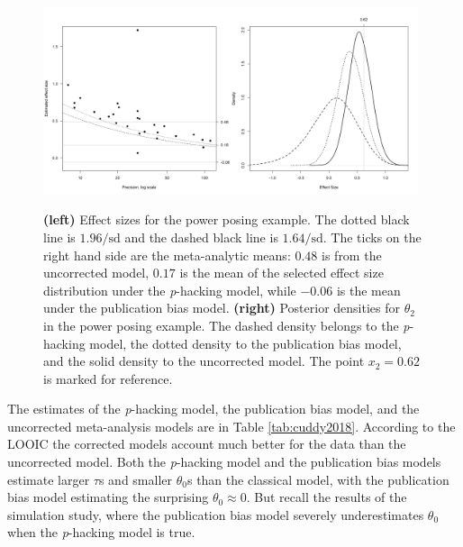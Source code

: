 \documentclass{article}
\theoremstyle{plain}
\theoremstyle{definition}
\begin{document}
\begin{figure}
\noindent \begin{centering}
\includegraphics[width=0.49\textwidth]{plots/cuddy2018}\includegraphics[width=0.49\textwidth]{plots/cuddy2018_posterior}
\par\end{centering}
\caption{\label{fig:cuddy2017} \textbf{(left)} Effect sizes for the power posing example. The dotted black line is $1.96/\textrm{sd}$ and the dashed black line is $1.64/\textrm{sd}$. The ticks on the right hand side are
the meta-analytic means: $0.48$ is from the uncorrected model, $0.17$ is the mean of the selected effect size distribution under the \textit{p}-hacking model, while $-0.06$ is the mean under the publication bias model. \textbf{(right)} Posterior densities for $\theta_{2}$ in the power posing example. The dashed density belongs to the \textit{p}-hacking model, the dotted density to the publication bias model, and the solid density to the uncorrected model. The point $x_{2}=0.62$ is marked for reference.}
\end{figure}

The estimates of the \textit{p}-hacking model, the publication bias model, and the uncorrected meta-analysis models are in Table \ref{tab:cuddy2018}. According to the LOOIC the corrected models account much better for the data than the uncorrected model. Both the \textit{p}-hacking model and the publication bias models estimate
larger $\tau$s and smaller $\theta_{0}$s than the classical model, with the publication bias model estimating the surprising $\theta_{0}\approx0$. But recall the results of the simulation study, where the publication bias model severely underestimates $\theta_0$ when the \textit{p}-hacking model is true.
\end{document}
